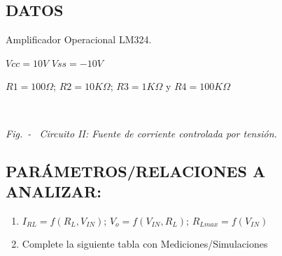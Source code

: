 \subsection{DATOS}
Amplificador Operacional LM324.

$Vcc = 10V$  $Vss = -10V$

$R1 = 100\Omega$; $R2 = 10K\Omega$; $R3 = 1K\Omega$ y $R4 = 100K\Omega$

\begin{center}
	 \\
	\begin{center}
    	\begin{small}
        \textit{Fig.\thefigure \ - \ 	Circuito II: Fuente de corriente controlada por tensión.}
		\end{small}
    \end{center}
\end{center}

\subsection{PARÁMETROS/RELACIONES A ANALIZAR:}


\begin{enumerate}[2.1]
    \item $I_{RL} = f(R_{L} ,V_{IN} ) $; $V_{o} = f(V_{IN} ,R_{L} )$; $R_{Lmax} =f(V_{IN})$
    \item Complete la siguiente tabla con Mediciones/Simulaciones
\end{enumerate}

